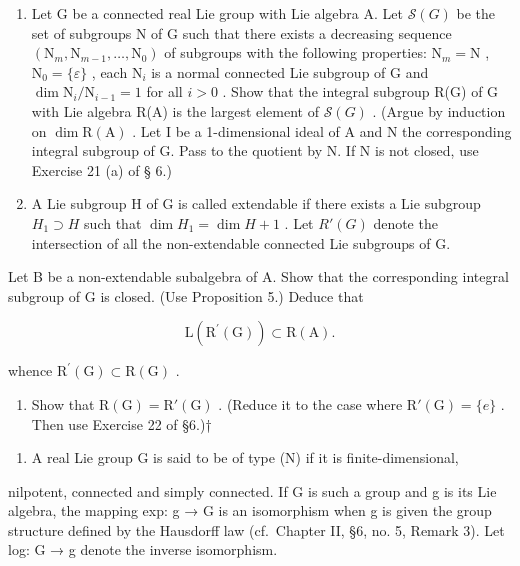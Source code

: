\begin{enumerate}
\def\labelenumi{(\alph{enumi})}
\setcounter{enumi}{11}
\item
  Let G be a connected real Lie group with Lie algebra A. Let \(\mathcal{S}(G)\) be the set of subgroups N of G such that there exists a decreasing sequence \((\mathrm{N}_m, \mathrm{N}_{m-1}, \ldots, \mathrm{N}_0)\) of subgroups with the following properties: \(\mathrm{N}_m = \mathrm{N}\) , \(\mathrm{N}_0 = \{\varepsilon\}\) , each \(\mathrm{N}_i\) is a normal connected Lie subgroup of G and \(\dim \mathrm{N}_i / \mathrm{N}_{i-1} = 1\) for all \(i > 0\) . Show that the integral subgroup R(G) of G with Lie algebra R(A) is the largest element of \(\mathcal{S}(G)\) . (Argue by induction on \(\dim \mathrm{R(A)}\) . Let I be a 1-dimensional ideal of A and N the corresponding integral subgroup of G. Pass to the quotient by N. If N is not closed, use Exercise 21 (a) of § 6.)
\item
  A Lie subgroup H of G is called extendable if there exists a Lie subgroup \(H_{1} \supset H\) such that \(\dim H_{1} = \dim H + 1\) . Let \(R'(G)\) denote the intersection of all the non-extendable connected Lie subgroups of G.
\end{enumerate}

Let B be a non-extendable subalgebra of A. Show that the corresponding integral subgroup of G is closed. (Use Proposition 5.) Deduce that

\[
\mathrm{L} (\mathrm{R} ^ {\prime} (\mathrm{G})) \subset \mathrm{R} (\mathrm{A}).
\]

whence \(\mathrm{R}^{\prime}(\mathrm{G})\subset\mathrm{R}(\mathrm{G})\) .

\begin{enumerate}
\def\labelenumi{(\alph{enumi})}
\setcounter{enumi}{13}
\tightlist
\item
  Show that \(\mathrm{R}(\mathrm{G}) = \mathrm{R}'(\mathrm{G})\) . (Reduce it to the case where \(\mathrm{R}'(\mathrm{G}) = \{e\}\) . Then use Exercise 22 of §6.)†
\end{enumerate}

\begin{enumerate}
\def\labelenumi{\arabic{enumi}.}
\setcounter{enumi}{28}
\tightlist
\item
  A real Lie group G is said to be of type (N) if it is finite-dimensional,
\end{enumerate}

nilpotent, connected and simply connected. If G is such a group and g is its Lie algebra, the mapping exp: g → G is an isomorphism when g is given the group structure defined by the Hausdorff law (cf.~Chapter II, §6, no. 5, Remark 3). Let log: G → g denote the inverse isomorphism.

